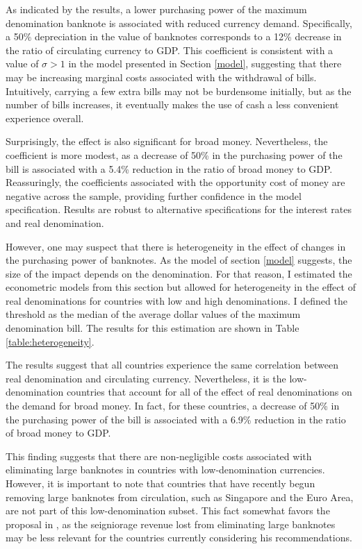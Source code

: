 \documentclass[12pt]{article}
\begin{document}
As indicated by the results, a lower purchasing power of the maximum denomination banknote is associated with reduced currency demand. Specifically, a 50\% depreciation in the value of banknotes corresponds to a 12\% decrease in the ratio of circulating currency to GDP. This coefficient is consistent with a value of $\sigma > 1$ in the model presented in Section \ref{model}, suggesting that there may be increasing marginal costs associated with the withdrawal of bills. Intuitively, carrying a few extra bills may not be burdensome initially, but as the number of bills increases, it eventually makes the use of cash a less convenient experience overall.

Surprisingly, the effect is also significant for broad money. Nevertheless, the coefficient is more modest, as a decrease of 50\% in the purchasing power of the bill is associated with a 5.4\% reduction in the ratio of broad money to GDP. Reassuringly, the coefficients associated with the opportunity cost of money are negative across the sample, providing further confidence in the model specification. Results are robust to alternative specifications for the interest rates and real denomination. 


However, one may suspect that there is heterogeneity in the effect of changes in the purchasing power of banknotes. As the model of section \ref{model} suggests, the size of the impact depends on the denomination. For that reason, I estimated the econometric models from this section but allowed for heterogeneity in the effect of real denominations for countries with low and high denominations. I defined the threshold as the median of the average dollar values of the maximum denomination bill. The results for this estimation are shown in Table \ref{table:heterogeneity}.

The results suggest that all countries experience the same correlation between real denomination and circulating currency. Nevertheless, it is the low-denomination countries that account for all of the effect of real denominations on the demand for broad money. In fact, for these countries, a decrease of 50\% in the purchasing power of the bill is associated with a 6.9\% reduction in the ratio of broad money to GDP. 

This finding suggests that there are non-negligible costs associated with eliminating large banknotes in countries with low-denomination currencies. However, it is important to note that countries that have recently begun removing large banknotes from circulation, such as Singapore and the Euro Area, are not part of this low-denomination subset. This fact somewhat favors the proposal in \cite{rogoff2016}, as the seigniorage revenue lost from eliminating large banknotes may be less relevant for the countries currently considering his recommendations.
\end{document}
